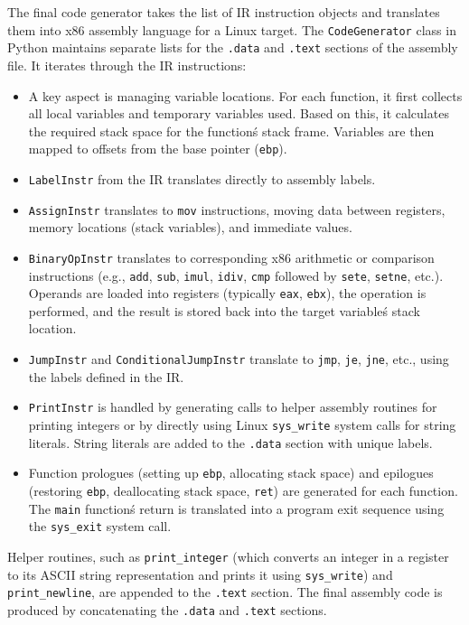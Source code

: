 \documentclass[12pt, letterpaper]{article}
\begin{document}
The final code generator takes the list of IR instruction objects and translates them into x86 assembly language for a Linux target.\@
The \texttt{CodeGenerator} class in Python maintains separate lists for the \texttt{.data} and \texttt{.text} sections of the assembly file.\@
It iterates through the IR instructions:
\begin{itemize}
    \item A key aspect is managing variable locations. For each function, it first collects all local variables and temporary variables used. Based on this, it calculates the required stack space for the function\'s stack frame. Variables are then mapped to offsets from the base pointer (\texttt{ebp}).
    \item \texttt{LabelInstr} from the IR translates directly to assembly labels.
    \item \texttt{AssignInstr} translates to \texttt{mov} instructions, moving data between registers, memory locations (stack variables), and immediate values.
    \item \texttt{BinaryOpInstr} translates to corresponding x86 arithmetic or comparison instructions (e.g., \texttt{add}, \texttt{sub}, \texttt{imul}, \texttt{idiv}, \texttt{cmp} followed by \texttt{sete}, \texttt{setne}, etc.). Operands are loaded into registers (typically \texttt{eax}, \texttt{ebx}), the operation is performed, and the result is stored back into the target variable\'s stack location.
    \item \texttt{JumpInstr} and \texttt{ConditionalJumpInstr} translate to \texttt{jmp}, \texttt{je}, \texttt{jne}, etc., using the labels defined in the IR.\@
    \item \texttt{PrintInstr} is handled by generating calls to helper assembly routines for printing integers or by directly using Linux \texttt{sys\_write} system calls for string literals. String literals are added to the \texttt{.data} section with unique labels.
    \item Function prologues (setting up \texttt{ebp}, allocating stack space) and epilogues (restoring \texttt{ebp}, deallocating stack space, \texttt{ret}) are generated for each function. The \texttt{main} function\'s return is translated into a program exit sequence using the \texttt{sys\_exit} system call.
\end{itemize}
Helper routines, such as \texttt{print\_integer} (which converts an integer in a register to its ASCII string representation and prints it using \texttt{sys\_write}) and \texttt{print\_newline}, are appended to the \texttt{.text} section. The final assembly code is produced by concatenating the \texttt{.data} and \texttt{.text} sections.
\end{document}
